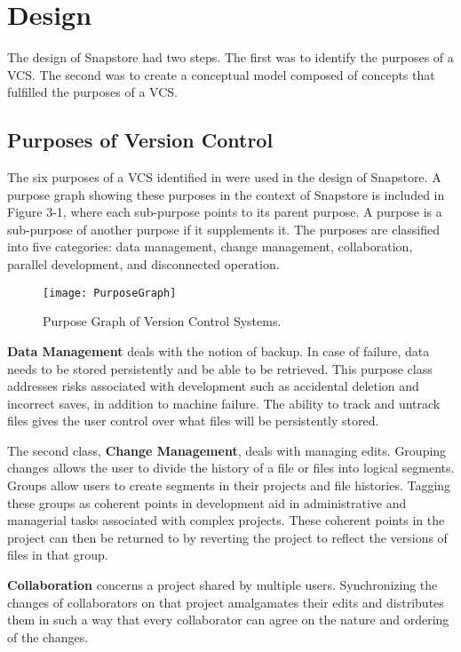 \chapter{Design}

The design of Snapstore had two steps. The first was to identify the purposes of a VCS. The second was to create a conceptual model composed of concepts that fulfilled the purposes of a VCS.

\section{Purposes of Version Control}

The six purposes of a VCS identified in \cite{RossoJackson} were used in the design of Snapstore. A purpose graph showing these purposes in the context of Snapstore is included in Figure 3-1, where each sub-purpose points to its parent purpose. A purpose is a sub-purpose of another purpose if it supplements it. The purposes are classified into five categories: data management, change management, collaboration, parallel development, and disconnected operation.

\begin{figure}
\begin{center}
\texttt{[image: PurposeGraph]}
\end{center}
\caption{Purpose Graph of Version Control Systems.}
\label{arm:fig1}
\end{figure}

\textbf{Data Management} deals with the notion of backup. In case of failure, data needs to be stored persistently and be able to be retrieved. This purpose class addresses risks associated with development such as accidental deletion and incorrect saves, in addition to machine failure. The ability to track and untrack files gives the user control over what files will be persistently stored.

The second class, \textbf{Change Management}, deals with managing edits. Grouping changes allows the user to divide the history of a file or files into logical segments. Groups allow users to create segments in their projects and file histories. Tagging these groups as coherent points in development aid in administrative and managerial tasks associated with complex projects. These coherent points in the project can then be returned to by reverting the project to reflect the versions of files in that group.

\textbf{Collaboration} concerns a project shared by multiple users. Synchronizing the changes of collaborators on that project amalgamates their edits and distributes them in such a way that every collaborator can agree on the nature and ordering of the changes.

